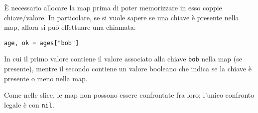 \documentclass[../../thesis.tex]{subfiles}
\begin{document}
    È necessario allocare la map prima di poter memorizzare in esso coppie chiave/valore.
    In particolare, se si vuole sapere se una chiave è presente nella map, allora si può effettuare una chiamata:
    \begin{lstlisting}[frame = single, label = {lst:lstlisting3-3.12}]
age, ok = ages["bob"]
    \end{lstlisting}
    In cui il primo valore contiene il valore associato alla chiave \verb"bob" nella map (se presente), mentre il secondo contiene un valore booleano che indica se la chiave è presente o meno nella map.
    \hfill \vspace{12pt}

    Come nelle slice, le map non possono essere confrontate fra loro;
    l'unico confronto legale è con \verb"nil".
\end{document}
